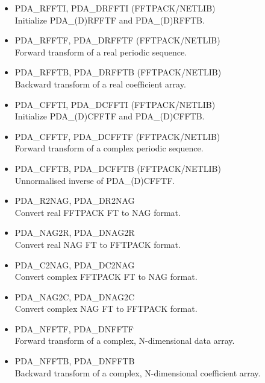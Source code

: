 \documentclass[11pt,twoside]{article}
\newcommand{\htmlref}[2]{#1}
\begin{document}
\begin{itemize}

\item \htmlref{PDA\_RFFTI, PDA\_DRFFTI}{PDA\_RFFTI} (FFTPACK/NETLIB)\ \\
   Initialize PDA\_(D)RFFTF and PDA\_(D)RFFTB.
\item \htmlref{PDA\_RFFTF, PDA\_DRFFTF}{PDA\_RFFTF} (FFTPACK/NETLIB)\ \\
   Forward transform of a real periodic sequence.
\item \htmlref{PDA\_RFFTB, PDA\_DRFFTB}{PDA\_RFFTB} (FFTPACK/NETLIB)\ \\
   Backward transform of a real coefficient array.
\item \htmlref{PDA\_CFFTI, PDA\_DCFFTI}{PDA\_CFFTI} (FFTPACK/NETLIB)\ \\
   Initialize PDA\_(D)CFFTF and PDA\_(D)CFFTB.
\item \htmlref{PDA\_CFFTF, PDA\_DCFFTF}{PDA\_CFFTF} (FFTPACK/NETLIB)\ \\
   Forward transform of a complex periodic sequence.
\item \htmlref{PDA\_CFFTB, PDA\_DCFFTB}{PDA\_CFFTB} (FFTPACK/NETLIB)\ \\
   Unnormalised inverse of PDA\_(D)CFFTF.

\item \htmlref{PDA\_R2NAG, PDA\_DR2NAG}{PDA\_R2NAG}\ \\
   Convert real FFTPACK FT to NAG format.
\item \htmlref{PDA\_NAG2R, PDA\_DNAG2R}{PDA\_NAG2R}\ \\
   Convert real NAG FT to FFTPACK format.
\item \htmlref{PDA\_C2NAG, PDA\_DC2NAG}{PDA\_C2NAG}\ \\
   Convert complex FFTPACK FT to NAG format.
\item \htmlref{PDA\_NAG2C, PDA\_DNAG2C}{PDA\_NAG2C}\ \\
   Convert complex NAG FT to FFTPACK format.

\item \htmlref{PDA\_NFFTF, PDA\_DNFFTF}{PDA\_NFFTF}\ \\
   Forward transform of a complex, N-dimensional data array.
\item \htmlref{PDA\_NFFTB, PDA\_DNFFTB}{PDA\_NFFTB}\ \\
   Backward transform of a complex, N-dimensional coefficient array.

\end{itemize}
\end{document}
